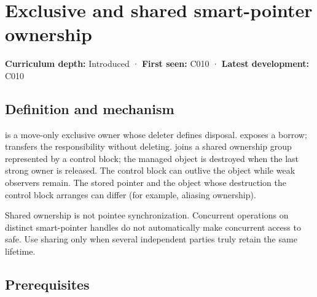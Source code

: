 \hypertarget{appendix-51602cabe815}{}\label{referencestart:appendix-51602cabe815}
\section{Exclusive and shared smart-pointer ownership}\label{appendix-51602cabe815-exclusive-and-shared-smart-pointer-ownership}

\hypertarget{appendix-51602cabe815-exclusive-and-shared-smart-pointer-ownership}{}

\textbf{Curriculum depth:} Introduced · \textbf{First seen:} C010 · \textbf{Latest development:} C010

\begin{allmightroledefinition}

\subsection{Definition and mechanism}\label{appendix-51602cabe815-definition-and-mechanism}

\hypertarget{appendix-51602cabe815-definition-and-mechanism}{}

 is a move-only exclusive owner whose deleter  defines disposal.  exposes a borrow;  transfers the responsibility without deleting.  joins a shared ownership group represented by a control block; the managed object is destroyed when the last strong owner is released. The control block can outlive the object while weak observers remain. The stored pointer and the object whose destruction the control block arranges can differ (for example, aliasing ownership).

\end{allmightroledefinition}

Shared ownership is not pointee synchronization. Concurrent operations on distinct smart-pointer handles do not automatically make concurrent access to  safe. Use sharing only when several independent parties truly retain the same lifetime.

\subsection{Prerequisites}\label{appendix-51602cabe815-prerequisites}

